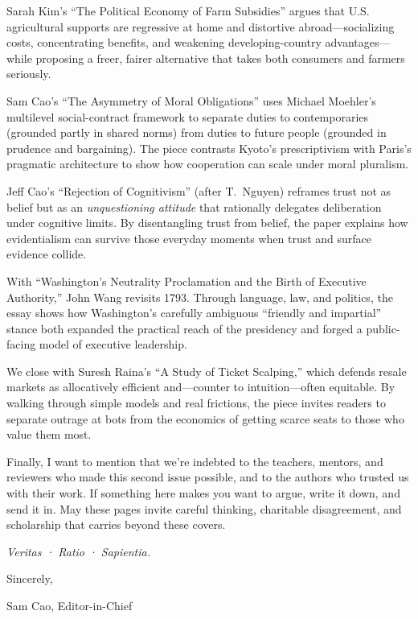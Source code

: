 \documentclass[12pt, letterpaper, openany]{book}
\begin{document}
Sarah Kim’s “The Political Economy of Farm Subsidies” argues that U.S. agricultural supports are regressive at home and distortive abroad—socializing costs, concentrating benefits, and weakening developing-country advantages—while proposing a freer, fairer alternative that takes both consumers and farmers seriously.

Sam Cao’s “The Asymmetry of Moral Obligations” uses Michael Moehler’s multilevel social-contract framework to separate duties to contemporaries (grounded partly in shared norms) from duties to future people (grounded in prudence and bargaining). The piece contrasts Kyoto’s prescriptivism with Paris’s pragmatic architecture to show how cooperation can scale under moral pluralism.

Jeff Cao’s “Rejection of Cognitivism” (after T.\ Nguyen) reframes trust not as belief but as an \emph{unquestioning attitude} that rationally delegates deliberation under cognitive limits. By disentangling trust from belief, the paper explains how evidentialism can survive those everyday moments when trust and surface evidence collide.

With “Washington’s Neutrality Proclamation and the Birth of Executive Authority,” John Wang revisits 1793. Through language, law, and politics, the essay shows how Washington’s carefully ambiguous “friendly and impartial” stance both expanded the practical reach of the presidency and forged a public-facing model of executive leadership.

We close with Suresh Raina’s “A Study of Ticket Scalping,” which defends resale markets as allocatively efficient and—counter to intuition—often equitable. By walking through simple models and real frictions, the piece invites readers to separate outrage at bots from the economics of getting scarce seats to those who value them most.

Finally, I want to mention that we’re indebted to the teachers, mentors, and reviewers who made this second issue possible, and to the authors who trusted us with their work. If something here makes you want to argue, write it down, and send it in. May these pages invite careful thinking, charitable disagreement, and scholarship that carries beyond these covers.

\medskip
\emph{Veritas · Ratio · Sapientia.}

\medskip

\noindent Sincerely,

 Sam Cao, Editor-in-Chief

\tableofcontents
\end{document}
